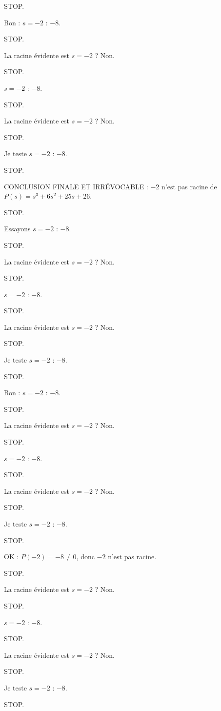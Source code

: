 \documentclass[11pt]{article}
\begin{document}
\begin{exoresolu}
\begin{enumerate}
STOP. 

Bon : $s = -2$ : $-8$. 

STOP. 

La racine évidente est $s = -2$ ? Non. 

STOP. 

$s = -2$ : $-8$. 

STOP. 

La racine évidente est $s = -2$ ? Non. 

STOP. 

Je teste $s = -2$ : $-8$. 

STOP. 

CONCLUSION FINALE ET IRRÉVOCABLE : $-2$ n'est pas racine de $P(s) = s^3 + 6s^2 + 25s + 26$. 

STOP. 

Essayons $s = -2$ : $-8$. 

STOP. 

La racine évidente est $s = -2$ ? Non. 

STOP. 

$s = -2$ : $-8$. 

STOP. 

La racine évidente est $s = -2$ ? Non. 

STOP. 

Je teste $s = -2$ : $-8$. 

STOP. 

Bon : $s = -2$ : $-8$. 

STOP. 

La racine évidente est $s = -2$ ? Non. 

STOP. 

$s = -2$ : $-8$. 

STOP. 

La racine évidente est $s = -2$ ? Non. 

STOP. 

Je teste $s = -2$ : $-8$. 

STOP. 

OK : $P(-2) = -8 \neq 0$, donc $-2$ n'est pas racine. 

STOP. 

La racine évidente est $s = -2$ ? Non. 

STOP. 

$s = -2$ : $-8$. 

STOP. 

La racine évidente est $s = -2$ ? Non. 

STOP. 

Je teste $s = -2$ : $-8$. 

STOP. 


\end{enumerate}
\end{exoresolu}
\end{document}
